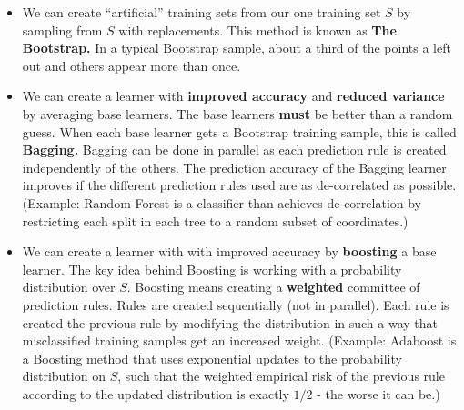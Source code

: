 \begin{itemize}
  \item We can create ``artificial'' training sets from our one training set
    $S$ by sampling from $S$ with replacements. This method is known as {\bf The
    Bootstrap.} In a typical Bootstrap sample, about a third of the points a
    left out and others appear more than once. 
  \item We can create a learner with {\bf improved accuracy} and {\bf reduced
    variance} by averaging base
    learners. The base learners {\bf must} be better than a random guess. 
  When each base learner gets a Bootstrap training sample, this is called {\bf
  Bagging.} Bagging can be done in parallel as each prediction rule is created
  independently of the others. The prediction accuracy of the Bagging learner improves if the
    different prediction rules used are as de-correlated as possible.
    (Example: Random
    Forest is a classifier than achieves de-correlation by restricting each
  split in each tree to a random subset of coordinates.)
\item We can create a learner with with improved accuracy by {\bf boosting} a base
  learner. The key idea behind Boosting is working with a probability
  distribution over $S$. Boosting means creating a {\bf weighted} committee of prediction
  rules. Rules are created sequentially (not in parallel). Each rule is created the previous rule 
  by modifying the distribution in such a way that misclassified training
  samples get an increased weight. (Example: Adaboost is a Boosting method that
    uses exponential updates to the probability distribution on $S$, such that
    the weighted empirical risk of the previous rule according to the updated
  distribution is exactly $1/2$ - the worse it can be.)
\end{itemize}




